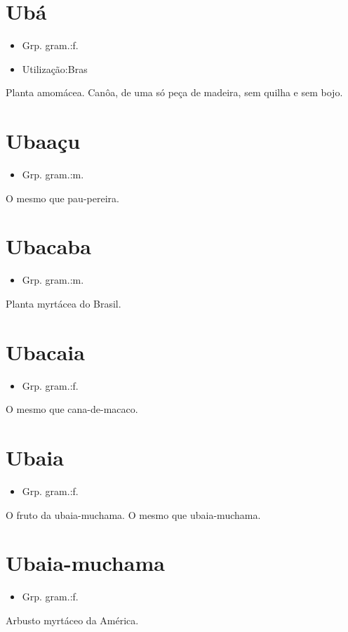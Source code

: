 \documentclass{article}
\begin{document}
\section{Ubá}
\begin{itemize}
\item {Grp. gram.:f.}
\end{itemize}
\begin{itemize}
\item {Utilização:Bras}
\end{itemize}
Planta amomácea.
Canôa, de uma só peça de madeira, sem quilha e sem bojo.
\section{Ubaaçu}
\begin{itemize}
\item {Grp. gram.:m.}
\end{itemize}
O mesmo que \textunderscore pau-pereira\textunderscore .
\section{Ubacaba}
\begin{itemize}
\item {Grp. gram.:m.}
\end{itemize}
Planta myrtácea do Brasil.
\section{Ubacaia}
\begin{itemize}
\item {Grp. gram.:f.}
\end{itemize}
O mesmo que \textunderscore cana-de-macaco\textunderscore .
\section{Ubaia}
\begin{itemize}
\item {Grp. gram.:f.}
\end{itemize}
O fruto da ubaia-muchama.
O mesmo que \textunderscore ubaia-muchama\textunderscore .
\section{Ubaia-muchama}
\begin{itemize}
\item {Grp. gram.:f.}
\end{itemize}
Arbusto myrtáceo da América.
\end{document}

